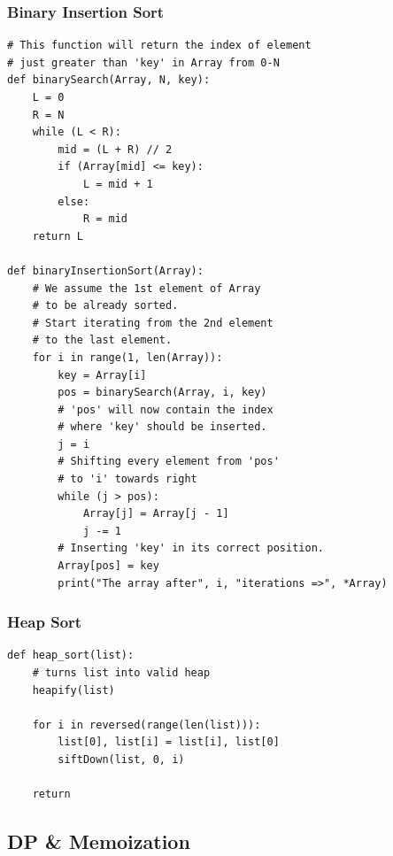 \subsubsection{Binary Insertion Sort}
\begin{codebox}
\begin{lstlisting}[style=CodeExpert]
# This function will return the index of element
# just greater than 'key' in Array from 0-N
def binarySearch(Array, N, key):
    L = 0
    R = N
    while (L < R):
        mid = (L + R) // 2
        if (Array[mid] <= key):
            L = mid + 1
        else:
            R = mid
    return L

def binaryInsertionSort(Array):
    # We assume the 1st element of Array
    # to be already sorted.
    # Start iterating from the 2nd element
    # to the last element.
    for i in range(1, len(Array)):
        key = Array[i]
        pos = binarySearch(Array, i, key)
        # 'pos' will now contain the index
        # where 'key' should be inserted.
        j = i
        # Shifting every element from 'pos'
        # to 'i' towards right
        while (j > pos):
            Array[j] = Array[j - 1]
            j -= 1
        # Inserting 'key' in its correct position.
        Array[pos] = key
        print("The array after", i, "iterations =>", *Array)
\end{lstlisting}
\end{codebox}

\subsubsection{Heap Sort}
\begin{codebox}
\begin{lstlisting}[style=CodeExpert]
def heap_sort(list):
    # turns list into valid heap
    heapify(list)

    for i in reversed(range(len(list))):
        list[0], list[i] = list[i], list[0]
        siftDown(list, 0, i)

    return
\end{lstlisting}
\end{codebox}



\subsection{DP \& Memoization}\label{sec:12-dp-memoization}



